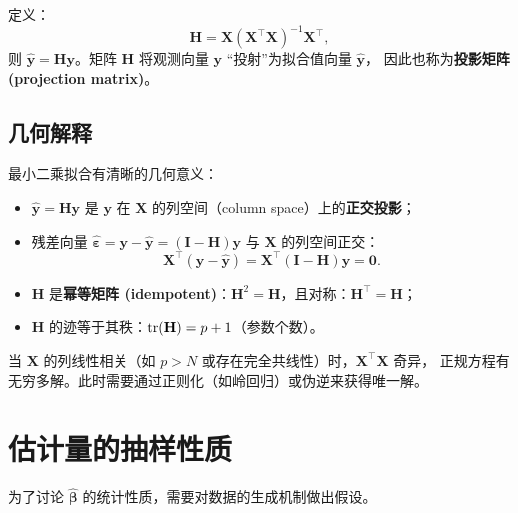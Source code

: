 \begin{definition}
定义：
\begin{equation}\label{eq:hat_matrix}
    \boxed{\mathbf{H} = \mathbf{X} (\mathbf{X}^\top \mathbf{X})^{-1} \mathbf{X}^\top},
\end{equation}
则 $\hat{\mathbf{y}} = \mathbf{H} \mathbf{y}$。矩阵 $\mathbf{H}$ 将观测向量 $\mathbf{y}$ ``投射''为拟合值向量 $\hat{\mathbf{y}}$，
因此也称为\textbf{投影矩阵 (projection matrix)}。
\end{definition}

\subsection{几何解释}

最小二乘拟合有清晰的几何意义：

\begin{itemize}
    \item $\hat{\mathbf{y}} = \mathbf{H} \mathbf{y}$ 是 $\mathbf{y}$ 在 $\mathbf{X}$ 的列空间（column space）上的\textbf{正交投影}；
    \item 残差向量 $\hat{\bm{\varepsilon}} = \mathbf{y} - \hat{\mathbf{y}} = (\mathbf{I} - \mathbf{H})\mathbf{y}$ 与 $\mathbf{X}$ 的列空间正交：
    \begin{equation}
        \mathbf{X}^\top (\mathbf{y} - \hat{\mathbf{y}}) = \mathbf{X}^\top (\mathbf{I} - \mathbf{H}) \mathbf{y} = \mathbf{0}.
    \end{equation}
    \item $\mathbf{H}$ 是\textbf{幂等矩阵 (idempotent)}：$\mathbf{H}^2 = \mathbf{H}$，且对称：$\mathbf{H}^\top = \mathbf{H}$；
    \item $\mathbf{H}$ 的迹等于其秩：$\operatorname{tr}(\mathbf{H}) = p + 1$（参数个数）。
\end{itemize}

\begin{remark}
当 $\mathbf{X}$ 的列线性相关（如 $p > N$ 或存在完全共线性）时，$\mathbf{X}^\top \mathbf{X}$ 奇异，
正规方程有无穷多解。此时需要通过正则化（如岭回归）或伪逆来获得唯一解。
\end{remark}

\section{估计量的抽样性质}

为了讨论 $\hat{\bm{\beta}}$ 的统计性质，需要对数据的生成机制做出假设。

